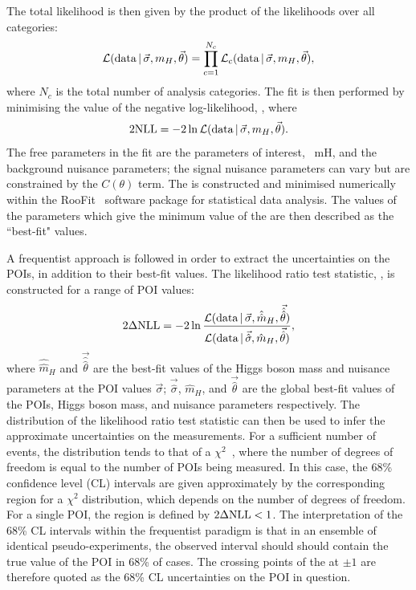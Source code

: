The total likelihood \Like is then given by the product of the likelihoods over all categories:
\begin{equation}
\mathcal{L}(\textrm{data}\,|\,\vec{\sigma},m_{H},\vec{\theta}) = \prod^{N_c}_{c=1} \mathcal{L}_c(\textrm{data}\,|\,\vec{\sigma},m_{H},\vec{\theta}),
\end{equation}
where $N_c$ is the total number of analysis categories.
The fit is then performed by minimising the value of the negative log-likelihood, \NLL, where
\begin{equation}
2\textrm{NLL} = -2\ln\mathcal{L}(\textrm{data}\,|\,\vec{\sigma},m_{H},\vec{\theta}).
\end{equation}
The free parameters in the fit are the parameters of interest, \
mH, and the background nuisance parameters;
the signal nuisance parameters can vary but are constrained by the $C(\theta)$ term.
The \NLL is constructed and minimised numerically within the RooFit~\cite{RooFit} 
software package for statistical data analysis.
The values of the parameters which give the minimum value of the \NLL
are then described as the ``best-fit" values.

A frequentist approach is followed in order to extract the uncertainties on the POIs, 
in addition to their best-fit values.
The likelihood ratio test statistic, \dNLL, is constructed for a range of POI values:
\begin{equation}
2\Delta\textrm{NLL} = -2\ln\frac{ \mathcal{L}(\textrm{data}\,|\,\vec{\sigma},\hat{\hat{m}}_H,\vec{\hat{\hat{\theta}}}) }
                  { \mathcal{L}(\textrm{data}\,|\,\vec{\hat{\sigma}},\hat{m}_H,\vec{\hat{\theta}}) },
\end{equation}
where $\hat{\hat{m}}_H$ and $\vec{\hat{\hat{\theta}}}$ are the best-fit values 
of the Higgs boson mass and nuisance parameters at the POI values $\vec{\sigma}$;
$\vec{\hat{\sigma}}$, $\hat{m}_H$, and $\vec{\hat{\theta}}$ are the global best-fit values 
of the POIs, Higgs boson mass, and nuisance parameters respectively.
The distribution of the likelihood ratio test statistic 
can then be used to infer the approximate uncertainties on the measurements.
For a sufficient number of events, %
the distribution tends to that of a $\chi^2$~\cite{Asymptotic}, 
where the number of degrees of freedom is equal to the number of POIs being measured.
In this case, the 68\% confidence level (CL) intervals 
are given approximately by the corresponding region for a $\chi^2$ distribution, 
which depends on the number of degrees of freedom.
For a single POI, the region is defined by $2\Delta\textrm{NLL} < 1$.
The interpretation of the 68\% CL intervals within the frequentist paradigm 
is that in an ensemble of identical pseudo-experiments, 
the observed interval should should contain the true value of the POI in 68\% of cases.
The crossing points of the \dNLL at $\pm 1$ are therefore quoted
as the 68\% CL uncertainties on the POI in question.

